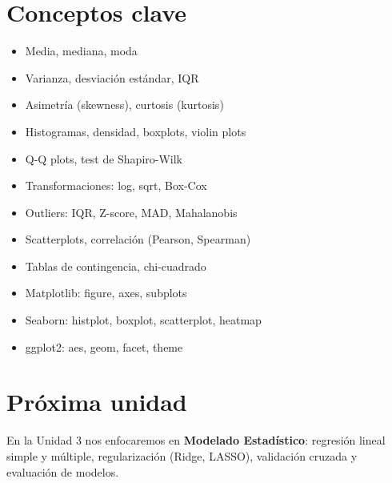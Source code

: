 \documentclass[a4paper,11pt]{article}
\begin{document}
\section*{Conceptos clave}

\begin{itemize}[leftmargin=*]
    \item Media, mediana, moda
    \item Varianza, desviación estándar, IQR
    \item Asimetría (skewness), curtosis (kurtosis)
    \item Histogramas, densidad, boxplots, violin plots
    \item Q-Q plots, test de Shapiro-Wilk
    \item Transformaciones: log, sqrt, Box-Cox
    \item Outliers: IQR, Z-score, MAD, Mahalanobis
    \item Scatterplots, correlación (Pearson, Spearman)
    \item Tablas de contingencia, chi-cuadrado
    \item Matplotlib: figure, axes, subplots
    \item Seaborn: histplot, boxplot, scatterplot, heatmap
    \item ggplot2: aes, geom, facet, theme
\end{itemize}

\section*{Próxima unidad}

En la Unidad 3 nos enfocaremos en \textbf{Modelado Estadístico}: regresión lineal simple y múltiple, regularización (Ridge, LASSO), validación cruzada y evaluación de modelos.
\end{document}
